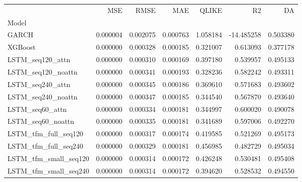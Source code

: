 \begin{tabular}{lrrrrrr}
\toprule
 & MSE & RMSE & MAE & QLIKE & R2 & DA \\
Model &  &  &  &  &  &  \\
\midrule
GARCH & 0.000004 & 0.002075 & 0.000763 & 1.058184 & -14.485258 & 0.503380 \\
XGBoost & 0.000000 & 0.000328 & 0.000185 & 0.321007 & 0.613093 & 0.377178 \\
LSTM_seq120_attn & 0.000000 & 0.000310 & 0.000169 & 0.397180 & 0.539957 & 0.495133 \\
LSTM_seq120_noattn & 0.000000 & 0.000341 & 0.000193 & 0.328236 & 0.582242 & 0.493311 \\
LSTM_seq240_attn & 0.000000 & 0.000345 & 0.000186 & 0.369610 & 0.571683 & 0.493602 \\
LSTM_seq240_noattn & 0.000000 & 0.000347 & 0.000185 & 0.344540 & 0.567870 & 0.493640 \\
LSTM_seq60_attn & 0.000000 & 0.000334 & 0.000181 & 0.344997 & 0.600020 & 0.490078 \\
LSTM_seq60_noattn & 0.000000 & 0.000335 & 0.000181 & 0.341689 & 0.597006 & 0.492270 \\
LSTM_tfm_full_seq120 & 0.000000 & 0.000317 & 0.000174 & 0.419585 & 0.521269 & 0.495173 \\
LSTM_tfm_full_seq240 & 0.000000 & 0.000329 & 0.000181 & 0.456985 & 0.482729 & 0.495034 \\
LSTM_tfm_small_seq120 & 0.000000 & 0.000314 & 0.000172 & 0.426248 & 0.530481 & 0.495408 \\
LSTM_tfm_small_seq240 & 0.000000 & 0.000314 & 0.000172 & 0.394620 & 0.528532 & 0.494550 \\
\bottomrule
\end{tabular}
